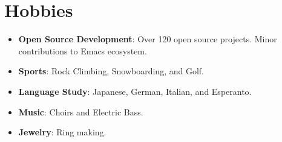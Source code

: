 \documentclass[letterpaper,11pt]{article}
\newcommand{\resumeItem}[2]{
  \item\small{
    \textbf{#1}{: #2 \vspace{-2pt}}
  }
}
\newcommand{\resumeSubItem}[2]{\resumeItem{#1}{#2}\vspace{-4pt}}
\newcommand{\resumeSubHeadingListStart}{\begin{itemize}[leftmargin=*]}
\newcommand{\resumeSubHeadingListEnd}{\end{itemize}}
\begin{document}
\section{Hobbies}
\resumeSubHeadingListStart
\resumeSubItem{Open Source Development}{Over 120 open source projects. Minor contributions to Emacs ecosystem.}
\resumeSubItem{Sports}{Rock Climbing, Snowboarding, and Golf.}
\resumeSubItem{Language Study}{Japanese, German, Italian, and Esperanto.}
\resumeSubItem{Music}{Choirs and Electric Bass.}
\resumeSubItem{Jewelry}{Ring making.}
\resumeSubHeadingListEnd
\end{document}
